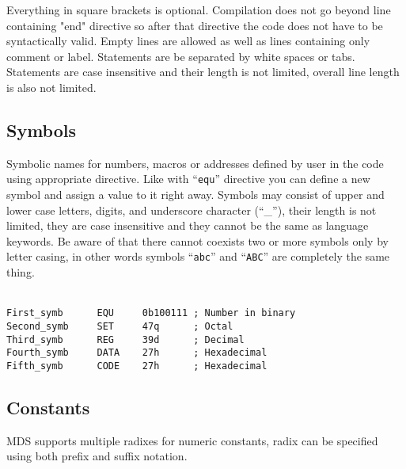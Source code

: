         Everything in square brackets is optional. Compilation does not go beyond line containing "end" directive so after that directive the code does not have to be syntactically valid. Empty lines are allowed as well as lines containing only comment or label. Statements are be separated by white spaces or tabs. Statements are case insensitive and their length is not limited, overall line length is also not limited.

    \subsection{Symbols}
        Symbolic names for numbers, macros or addresses defined by user in the code using appropriate directive. Like with ``\texttt{equ}'' directive you can define a new symbol and assign a value to it right away. Symbols may consist of upper and lower case letters, digits, and underscore character (``\_''), their length is not limited, they are case insensitive and they cannot be the same as language keywords. Be aware of that there cannot coexists two or more symbols only by letter casing, in other words symbols ``\texttt{abc}'' and ``\texttt{ABC}'' are completely the same thing.

        ~\\
        {
            \usecodefont
            \verb'First_symb      EQU     0b100111 ; Number in binary'\\
            \verb'Second_symb     SET     47q      ; Octal'\\
            \verb'Third_symb      REG     39d      ; Decimal'\\
            \verb'Fourth_symb     DATA    27h      ; Hexadecimal'\\
            \verb'Fifth_symb      CODE    27h      ; Hexadecimal'
        }

    \subsection{Constants}
        MDS supports multiple radixes for numeric constants, radix can be specified using both prefix and suffix notation.

